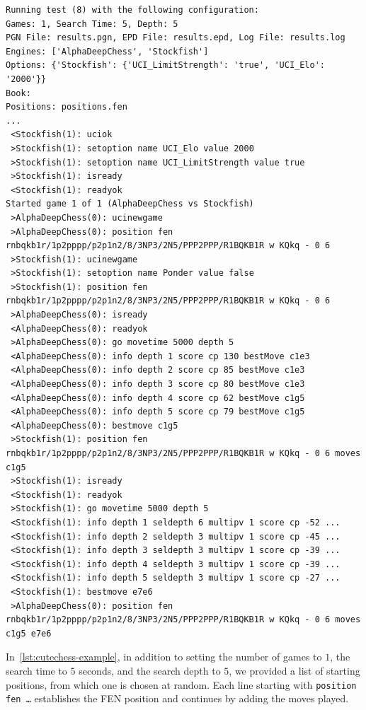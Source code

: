 \begin{lstlisting}[basicstyle=\ttfamily\scriptsize, breaklines=true, frame=single, caption={Example of \textit{Cutechess}}, label={lst:cutechess-example}]
Running test (8) with the following configuration:
Games: 1, Search Time: 5, Depth: 5
PGN File: results.pgn, EPD File: results.epd, Log File: results.log
Engines: ['AlphaDeepChess', 'Stockfish']
Options: {'Stockfish': {'UCI_LimitStrength': 'true', 'UCI_Elo': '2000'}}
Book: 
Positions: positions.fen
...
 <Stockfish(1): uciok
 >Stockfish(1): setoption name UCI_Elo value 2000
 >Stockfish(1): setoption name UCI_LimitStrength value true
 >Stockfish(1): isready
 <Stockfish(1): readyok
Started game 1 of 1 (AlphaDeepChess vs Stockfish)
 >AlphaDeepChess(0): ucinewgame
 >AlphaDeepChess(0): position fen rnbqkb1r/1p2pppp/p2p1n2/8/3NP3/2N5/PPP2PPP/R1BQKB1R w KQkq - 0 6
 >Stockfish(1): ucinewgame
 >Stockfish(1): setoption name Ponder value false
 >Stockfish(1): position fen rnbqkb1r/1p2pppp/p2p1n2/8/3NP3/2N5/PPP2PPP/R1BQKB1R w KQkq - 0 6
 >AlphaDeepChess(0): isready
 <AlphaDeepChess(0): readyok
 >AlphaDeepChess(0): go movetime 5000 depth 5
 <AlphaDeepChess(0): info depth 1 score cp 130 bestMove c1e3
 <AlphaDeepChess(0): info depth 2 score cp 85 bestMove c1e3
 <AlphaDeepChess(0): info depth 3 score cp 80 bestMove c1e3
 <AlphaDeepChess(0): info depth 4 score cp 62 bestMove c1g5
 <AlphaDeepChess(0): info depth 5 score cp 79 bestMove c1g5
 <AlphaDeepChess(0): bestmove c1g5
 >Stockfish(1): position fen rnbqkb1r/1p2pppp/p2p1n2/8/3NP3/2N5/PPP2PPP/R1BQKB1R w KQkq - 0 6 moves c1g5
 >Stockfish(1): isready
 <Stockfish(1): readyok
 >Stockfish(1): go movetime 5000 depth 5
 <Stockfish(1): info depth 1 seldepth 6 multipv 1 score cp -52 ...
 <Stockfish(1): info depth 2 seldepth 3 multipv 1 score cp -45 ...
 <Stockfish(1): info depth 3 seldepth 3 multipv 1 score cp -39 ...
 <Stockfish(1): info depth 4 seldepth 3 multipv 1 score cp -39 ...
 <Stockfish(1): info depth 5 seldepth 3 multipv 1 score cp -27 ...
 <Stockfish(1): bestmove e7e6
 >AlphaDeepChess(0): position fen rnbqkb1r/1p2pppp/p2p1n2/8/3NP3/2N5/PPP2PPP/R1BQKB1R w KQkq - 0 6 moves c1g5 e7e6
\end{lstlisting}

\noindent In~\cref{lst:cutechess-example}, in addition to setting the number of games to $1$, the search time to $5$ seconds, and the search depth to $5$, we provided a list of starting positions, from which one is chosen at random. Each line starting with \texttt{position fen \ldots} establishes the FEN position and continues by adding the moves played.

